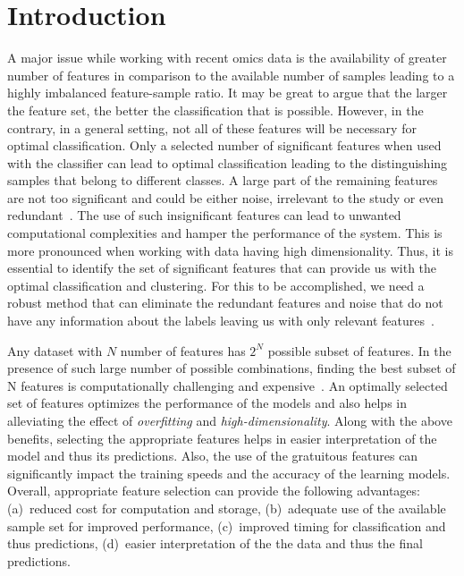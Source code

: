 \section{Introduction}

A major issue while working with recent omics data is the availability of greater number of features in comparison to the available number of samples leading to a highly imbalanced feature-sample ratio. 
It may be great to argue that the larger the feature set, the better the classification that is possible. 
However, in the contrary, in a general setting, not all of these features will be necessary for optimal classification. 
Only a selected number of significant features when used with the classifier can lead to optimal classification leading to the distinguishing samples that belong to different classes. 
A large part of the remaining features are not too significant and could be either noise, irrelevant to the study or even redundant~\citep{pirgazi2019efficient}. 
The use of such insignificant features can lead to unwanted computational complexities and hamper the performance of the system. 
This is more pronounced when working with data having high dimensionality. 
Thus, it is essential to identify the set of significant features that can provide us with the optimal classification and clustering. 
For this to be accomplished, we need a robust method that can eliminate the redundant features and noise that do not have any information about the labels leaving us with only relevant features~\cite{liu2012feature}. 

Any dataset with $N$ number of features has $2^N$ possible subset of features. 
In the presence of such large number of possible combinations, finding the best subset of N features is computationally challenging and expensive~\cite{liang2018review}.
An optimally selected set of features optimizes the performance of the models and also helps in alleviating the effect of \emph{overfitting} and \emph{high-dimensionality}. 
Along with the above benefits, selecting the appropriate features helps in easier interpretation of the model and thus its predictions. 
Also, the use of the gratuitous features can significantly impact the training speeds and the accuracy of the learning models. 
Overall, appropriate feature selection can provide the following advantages: (a)~reduced cost for computation and storage, (b)~adequate use of the available sample set for improved performance, (c)~improved timing for classification and thus predictions, (d)~easier interpretation of the the data and thus the final predictions.


